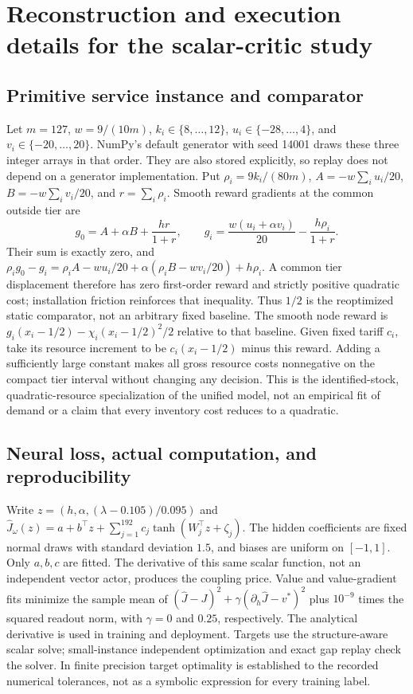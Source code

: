 \section{Reconstruction and execution details for the scalar-critic study}\label{ec:r14-details}
\subsection{Primitive service instance and comparator}
Let $m=127$, $w=9/(10m)$, $k_i\in\{8,\ldots,12\}$, $u_i\in\{-28,\ldots,4\}$, and $v_i\in\{-20,\ldots,20\}$. NumPy's default generator with seed 14001 draws these three integer arrays in that order. They are also stored explicitly, so replay does not depend on a generator implementation. Put $\rho_i=9k_i/(80m)$, $A=-w\sum_i u_i/20$, $B=-w\sum_i v_i/20$, and $r=\sum_i\rho_i$. Smooth reward gradients at the common outside tier are
\[
 g_0=A+\alpha B+\frac{hr}{1+r},\qquad
 g_i=\frac{w(u_i+\alpha v_i)}{20}-\frac{h\rho_i}{1+r}.
\]
Their sum is exactly zero, and $\rho_i g_0-g_i=\rho_i A-wu_i/20+\alpha(\rho_i B-wv_i/20)+h\rho_i$. A common tier displacement therefore has zero first-order reward and strictly positive quadratic cost; installation friction reinforces that inequality. Thus $1/2$ is the reoptimized static comparator, not an arbitrary fixed baseline. The smooth node reward is $g_i(x_i-1/2)-\chi_i(x_i-1/2)^2/2$ relative to that baseline. Given fixed tariff $c_i$, take its resource increment to be $c_i(x_i-1/2)$ minus this reward. Adding a sufficiently large constant makes all gross resource costs nonnegative on the compact tier interval without changing any decision. This is the identified-stock, quadratic-resource specialization of the unified model, not an empirical fit of demand or a claim that every inventory cost reduces to a quadratic.

\subsection{Neural loss, actual computation, and reproducibility}
Write $z=(h,\alpha,(\lambda-0.105)/0.095)$ and
$\widehat J_\omega(z)=a+b^\top z+\sum_{j=1}^{192}c_j\tanh(W_j^\top z+\zeta_j)$.
The hidden coefficients are fixed normal draws with standard deviation $1.5$, and biases are uniform on $[-1,1]$. Only $a,b,c$ are fitted. The derivative of this same scalar function, not an independent vector actor, produces the coupling price. Value and value-gradient fits minimize the sample mean of $(\widehat J-J)^2+\gamma(\partial_h\widehat J-v^*)^2$ plus $10^{-9}$ times the squared readout norm, with $\gamma=0$ and $0.25$, respectively. The analytical derivative is used in training and deployment. Targets use the structure-aware scalar solve; small-instance independent optimization and exact gap replay check the solver. In finite precision target optimality is established to the recorded numerical tolerances, not as a symbolic expression for every training label.

